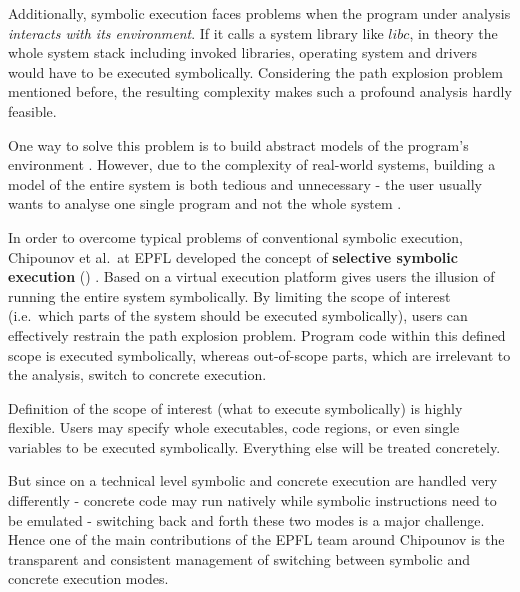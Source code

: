 Additionally, symbolic execution faces problems when the program under analysis \textit{interacts with its environment}.
If it calls a system library like $libc$, in theory the whole system stack including invoked libraries, operating system and drivers would have to be executed symbolically.
Considering the path explosion problem mentioned before, the resulting complexity makes such a profound analysis hardly feasible.

One way to solve this problem is to build abstract models of the program's environment .
However, due to the complexity of real-world systems, building a model of the entire system is both tedious and unnecessary - the user usually wants to analyse one single program and not the whole system \cite{chip09sel}.

\bigskip

In order to overcome typical problems of conventional symbolic execution, Chipounov et al.~at EPFL developed the concept of \textbf{selective symbolic execution} (\sse) \cite{chip09sel}.
Based on a virtual execution platform \sse gives users the illusion of running the entire system symbolically.
By limiting the scope of interest (i.e.~which parts of the system should be executed symbolically), users can effectively restrain the path explosion problem.
Program code within this defined scope is executed symbolically, whereas out-of-scope parts, which are irrelevant to the analysis, switch to concrete execution.


Definition of the scope of interest (what to execute symbolically) is highly flexible.
Users may specify whole executables, code regions, or even single variables to be executed symbolically. Everything else will be treated concretely.

But since on a technical level symbolic and concrete execution are handled very differently - concrete code may run natively while symbolic instructions need to be emulated - switching back and forth these two modes is a major challenge.
Hence one of the main contributions of the EPFL team around Chipounov is the transparent and consistent management of switching between symbolic and concrete execution modes.

